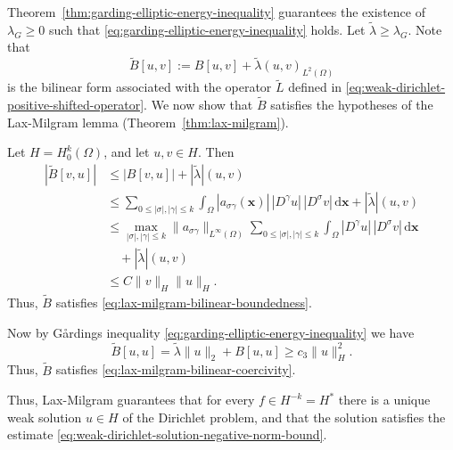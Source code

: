 \begin{Proof}
Theorem~\ref{thm:garding-elliptic-energy-inequality} guarantees the existence of $\lambda_G\geq0$ such that \eqref{eq:garding-elliptic-energy-inequality} holds. Let $\widetilde\lambda\geq\lambda_G$. Note that
\begin{equation}\label{eq:weak-dirichlet-shifted-bilinear-form}
\widetilde B[u,v]:=B[u,v]+\widetilde\lambda(u,v)_{L^2(\Omega)}
\end{equation}
is the bilinear form associated with the operator $\widetilde L$ defined in \eqref{eq:weak-dirichlet-positive-shifted-operator}. We now show that $\widetilde B$ satisfies the hypotheses of the Lax-Milgram lemma (Theorem~\ref{thm:lax-milgram}).

Let $H=H_0^k(\Omega)$, and let $u,v\in H$. Then\[\begin{aligned}
|\widetilde B[v,u]|&\leq|B[v,u]|+|\widetilde\lambda|(u,v)\\
&\leq\sum_{0\leq|\sigma|,|\gamma|\leq k}\int_\Omega|a_{\sigma\gamma}(\bm{x})|\,|D^\gamma u|\,|D^\sigma v|\,\mathrm{d}\bm{x}+|\widetilde\lambda|(u,v)\\
&\leq\max_{|\sigma|,|\gamma|\leq k}\|a_{\sigma\gamma}\|_{L^\infty(\Omega)}
\sum_{0\leq|\sigma|,|\gamma|\leq k}\int_\Omega|D^\gamma u|\,|D^\sigma v|\,\mathrm{d}\bm{x}\\
&\quad+|\widetilde\lambda|(u,v)\\
&\leq C\|v\|_H\|u\|_H.
\end{aligned}\]Thus, $\widetilde B$ satisfies \eqref{eq:lax-milgram-bilinear-boundedness}.

Now by Gårding\textquotesingle s inequality \eqref{eq:garding-elliptic-energy-inequality} we have
\begin{equation}\label{eq:weak-dirichlet-shifted-form-coercivity}
\widetilde B[u,u]=\widetilde\lambda\|u\|_2+B[u,u]\geq c_3\|u\|_H^2.
\end{equation}
Thus, $\widetilde B$ satisfies \eqref{eq:lax-milgram-bilinear-coercivity}.

Thus, Lax-Milgram guarantees that for every $f\in H^{-k}=H^*$ there is a unique weak solution $u\in H$ of the Dirichlet problem, and that the solution satisfies the estimate \eqref{eq:weak-dirichlet-solution-negative-norm-bound}.
\end{Proof}
